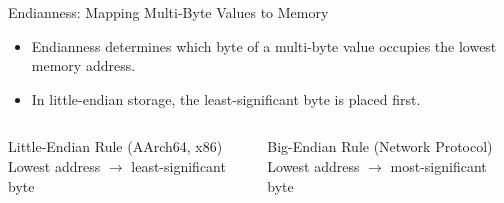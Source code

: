 \documentclass[aspectratio=169,11pt,t]{beamer}
\newcommand{\hex}[1]{\texttt{0x#1}}
\begin{document}
\begin{frame}{Endianness: Mapping Multi-Byte Values to Memory}

\begin{itemize}\setlength{\itemsep}{4pt}
  \item Endianness determines which byte of a multi-byte value occupies the lowest memory address.
  \item In little-endian storage, the least-significant byte is placed first.
\end{itemize}

\vfill

\begin{center}
\end{center}

\vfill

\begin{columns}[T,onlytextwidth]
\begin{block}{Little-Endian Rule (AArch64, x86)}
Lowest address $\rightarrow$ least-significant byte
\end{block}
\begin{block}{Big-Endian Rule (Network Protocol)}
Lowest address $\rightarrow$ most-significant byte
\end{block}
\end{columns}

\end{frame}





\end{document}

